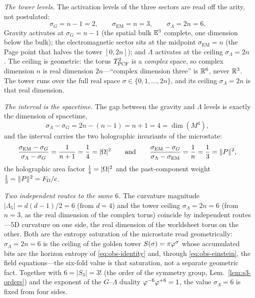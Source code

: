 \begin{remark}
\emph{The tower levels.} The activation levels of the three sectors are read
off the arity, not postulated:
\begin{equation}\label{eq:interval-levels}
  \sigma_G=n-1=2,\qquad \sigma_{\mathrm{EM}}=n=3,\qquad \sigma_\Lambda=2n=6 .
\end{equation}
Gravity activates at $\sigma_G=n-1$ (the spatial bulk $\mathbb{E}^{3}$ complete, one
dimension below the bulk); the electromagnetic sector sits at the midpoint
$\sigma_{\mathrm{EM}}=n$ (the Page point that halves the tower $[0,2n]$); and
$\Lambda$ activates at the ceiling $\sigma_\Lambda=2n$. The ceiling is
geometric: the torus $T^{2}_{\mathrm{PCF}}$ is a \emph{complex} space, so complex
dimension $n$ is real dimension $2n$---``complex dimension three'' is
$\mathbb{R}^{6}$, never $\mathbb{R}^{3}$. The tower runs over the full real space
$\sigma\in\{0,1,\dots,2n\}$, and its ceiling $\sigma_\Lambda=2n$ is that real
dimension.

\emph{The interval is the spacetime.} The gap between the gravity and
$\Lambda$ levels is exactly the dimension of spacetime,
\begin{equation}\label{eq:interval-gap}
  \sigma_\Lambda-\sigma_G=2n-(n-1)=n+1=4=\dim(M^{4}),
\end{equation}
and the interval carries the two holographic invariants of the microstate:
\begin{equation}\label{eq:interval-fractions}
  \frac{\sigma_{\mathrm{EM}}-\sigma_G}{\sigma_\Lambda-\sigma_G}
    =\frac{1}{n+1}=\frac14=|\Omega|^{2}
  \qquad\text{and}\qquad
  \frac{\sigma_{\mathrm{EM}}-\sigma_G}{\sigma_\Lambda-\sigma_{\mathrm{EM}}}
    =\frac1n=\frac13=\|P\|^{2},
\end{equation}
the holographic area factor $\tfrac14=|\Omega|^{2}$ and the past-component
weight $\tfrac13=\|P\|^{2}=F_\Omega/c$.

\emph{Two independent routes to the same $6$.} The curvature magnitude
$|\Lambda_5|=d(d-1)/2=6$ (from $d=4$) and the tower ceiling
$\sigma_\Lambda=2n=6$ (from $n=3$, as the real dimension of the complex
torus) coincide by independent routes---5D curvature on one side, the
real dimension of the worldsheet torus on the other. Both are the entropy
saturation of the microstate read geometrically: $\sigma_\Lambda=2n=6$ is the
ceiling of the golden tower $S(\sigma)=\pi\varphi^{\sigma}$ whose accumulated
bits are the horizon entropy of \eqref{eq:obs-identity} and, through
\eqref{eq:obs-einstein}, the field equations---the six-fold value is that
saturation, not a separate geometric fact. Together with $6=|S_{3}|=3!$ (the order of the symmetry
group, Lem.~\ref{lem:s3-orders}) and the exponent of the $G$--$\Lambda$ duality
$\varphi^{-6}\varphi^{+6}=1$, the value $\sigma_\Lambda=6$ is fixed from
four sides.


\end{remark}
